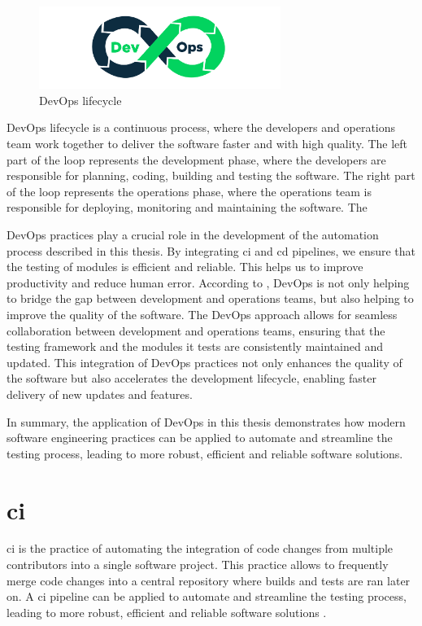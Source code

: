 \begin{figure}[!h]
    \centering
    \includegraphics[width=0.7\textwidth]{Images/devops_loop.pdf}
    \caption{DevOps lifecycle}
    \label{devops_lifecycle}
\end{figure}
DevOps lifecycle is a continuous process, where the developers and operations team work together to deliver the software faster and with high quality.
The left part of the loop represents the development phase, where the developers are responsible for planning, coding, building and testing the software. The
right part of the loop represents the operations phase, where the operations team is responsible for deploying, monitoring and maintaining the software. The

DevOps practices play a crucial role in the development of the automation process described in this thesis. By integrating \acrfull{ci} and \acrfull{cd} pipelines, we ensure that the testing of 
modules is efficient and reliable. This helps us to improve productivity and reduce human error. According to \cite{8257807}, DevOps is not only helping to bridge
the gap between development and operations teams, but also helping to improve the quality of the software.
 The DevOps approach allows for seamless collaboration between development and operations teams, 
ensuring that the testing framework and the modules it tests are consistently maintained and updated. This integration of DevOps practices not only enhances the quality of the software but also 
accelerates the development lifecycle, enabling faster delivery of new updates and features.\newline

In summary, the application of DevOps in this thesis demonstrates how modern software engineering practices can be applied to automate and streamline the testing process, leading to more robust,
efficient and reliable software solutions.

\section{\acrlong{ci}}
    \acrfull{ci} is the practice of automating the integration of code changes from multiple contributors into a single software project. This practice allows
    to frequently merge code changes into a central repository where builds and tests are ran later on. A \acrshort{ci} pipeline can be applied to automate 
    and streamline the testing process, leading to more robust, efficient and reliable software solutions \cite{8421965}.


